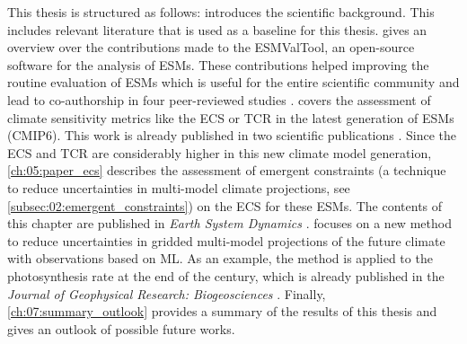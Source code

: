 This thesis is structured as follows: 
introduces the scientific background. This includes relevant literature that is
used as a baseline for this thesis.  gives an overview
over the contributions made to the \ac{ESMValTool}, an open-source software for
the analysis of \acp{ESM}. These contributions helped improving the routine
evaluation of \acp{ESM} which is useful for the entire scientific community and
lead to co-authorship in four peer-reviewed studies \autocite{Eyring2020,
  Lauer2020, Righi2020, Weigel2020}. 
covers the assessment of climate sensitivity metrics like the \ac{ECS} or
\ac{TCR} in the latest generation of \acp{ESM} (\acs{CMIP}6). This work is
already published in two scientific publications \autocite{Bock2020,
  Meehl2020}. Since the \ac{ECS} and \ac{TCR} are considerably higher in this
new climate model generation, \cref{ch:05:paper_ecs} describes the assessment
of emergent constraints (a technique to reduce uncertainties in multi-model
climate projections, see \cref{subsec:02:emergent_constraints}) on the \ac{ECS}
for these \acp{ESM}. The contents of this chapter are published in \emph{Earth
  System Dynamics} \autocite{Schlund2020a}.  focuses on a
new method to reduce uncertainties in gridded multi-model projections of the
future climate with observations based on \ac{ML}. As an example, the method is
applied to the photosynthesis rate at the end of the  century, which is
already published in the \emph{Journal of Geophysical Research: Biogeosciences}
\autocite{Schlund2020}. Finally, \cref{ch:07:summary_outlook} provides a
summary of the results of this thesis and gives an outlook of possible future
works.
